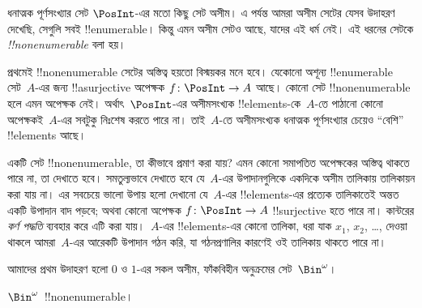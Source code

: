 \documentclass[../../../include/open-logic-section]{subfiles}
\begin{document}



ধনাত্মক পূর্ণসংখ্যার সেট $\PosInt$-এর মতো কিছু সেট অসীম। এ পর্যন্ত আমরা অসীম সেটের যেসব উদাহরণ দেখেছি, সেগুলি সবই !!{enumerable}। কিন্তু এমন অসীম সেটও আছে, যাদের এই ধর্ম নেই। এই ধরনের সেটকে \emph{!!{nonenumerable}} বলা হয়।

প্রথমেই !!{nonenumerable} সেটের অস্তিত্ব হয়তো বিস্ময়কর মনে হবে। যেকোনো অশূন্য !!{enumerable} সেট~$A$-এর জন্য !!a{surjective} অপেক্ষক $f \colon \PosInt \to A$ আছে। কোনো সেট !!{nonenumerable} হলে এমন অপেক্ষক নেই। অর্থাৎ~$\PosInt$-এর অসীমসংখ্যক !!{element}s-কে~$A$-তে পাঠানো কোনো অপেক্ষকই~$A$-এর সবটুকু নিঃশেষ করতে পারে না। তাই~$A$-তে অসীমসংখ্যক ধনাত্মক পূর্ণসংখ্যার চেয়েও ``বেশি'' !!{element}s আছে।

একটি সেট !!{nonenumerable}, তা কীভাবে প্রমাণ করা যায়? এমন কোনো সমাপতিত অপেক্ষকের অস্তিত্ব থাকতে পারে না, তা দেখাতে হবে। সমতুল্যভাবে দেখাতে হবে যে~$A$-এর উপাদানগুলিকে একদিকে অসীম তালিকায় তালিকায়ন করা যায় না। এর সবচেয়ে ভালো উপায় হলো দেখানো যে~$A$-এর !!{element}s-এর প্রত্যেক তালিকাতেই অন্তত একটি উপাদান বাদ পড়বে; অথবা কোনো অপেক্ষক $f\colon \PosInt \to A$ !!{surjective} হতে পারে না। কান্টরের \emph{কর্ণ পদ্ধতি} ব্যবহার করে এটি করা যায়।~$A$-এর !!{element}s-এর কোনো তালিকা, ধরা যাক $x_1$, $x_2$, \dots, দেওয়া থাকলে আমরা~$A$-এর আরেকটি উপাদান গঠন করি, যা গঠনপ্রণালির কারণেই ওই তালিকায় থাকতে পারে না।

আমাদের প্রথম উদাহরণ হলো $0$ ও $1$-এর সকল অসীম, ফাঁকবিহীন অনুক্রমের সেট~$\Bin^\omega$।

\begin{thm}
$\Bin^\omega$~!!{nonenumerable}।
\end{thm}
\end{document}
